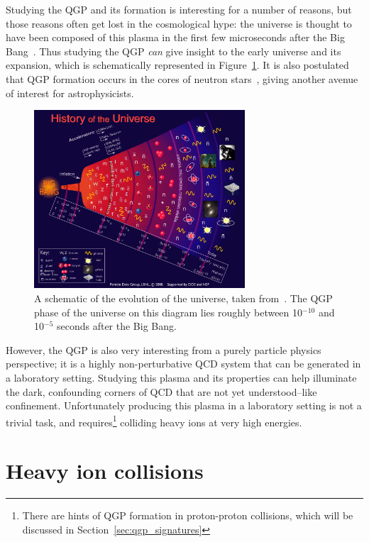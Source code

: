 Studying the QGP and its formation is interesting for a number of reasons, but those reasons often get lost in the cosmological hype: the universe is thought to have been composed of this plasma in the first few microseconds after the Big Bang~\cite{QGP3}. Thus studying the QGP \textit{can} give insight to the early universe and its expansion, which is schematically represented in Figure~\ref{fig:qgp_universe}. It is also postulated that QGP formation occurs in the cores of neutron stars~\cite{QGPNeutron}, giving another avenue of interest for astrophysicists.

\begin{figure}
    \centering
    \includegraphics[width=0.7\textwidth]{figures/introduction/qgp_universe.jpg}
    \caption{A schematic of the evolution of the universe, taken from~\cite{PDG}. The QGP phase of the universe on this diagram lies roughly between 10$^{-10}$ and 10$^{-5}$ seconds after the Big Bang.}
    \label{fig:qgp_universe}
\end{figure}

However, the QGP is also very interesting from a purely particle physics perspective; it is a highly non-perturbative QCD system that can be generated in a laboratory setting. Studying this plasma and its properties can help illuminate the dark, confounding corners of QCD that are not yet understood--like confinement. Unfortunately producing this plasma in a laboratory setting is not a trivial task, and requires\footnote{There are hints of QGP formation in proton-proton collisions, which will be discussed in Section~\ref{sec:qgp_signatures}} colliding heavy ions at very high energies.


\section{Heavy ion collisions}
\label{sec:heavy_ion_collisions}

